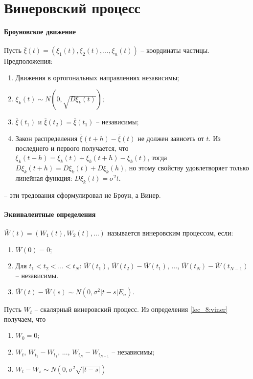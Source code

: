 \section{Винеровский процесс}

\paragraph{Броуновское движение}

Пусть $\bar{\xi}(t) = \left( \xi_1(t), \xi_2(t), \dots, \xi_n(t) \right) $
-- координаты частицы.
Предположения:
\begin{enumerate}
  \item Движения в ортогональных направлениях независимы;
  \item $\xi_k(t) \sim N(0, \sqrt{D\xi_k(t)})$;
  \item $\bar{\xi}(t_1)$ и $\bar{\xi}(t_2) = \bar{\xi}(t_1)$ -- независимы;
  \item Закон распределения $\bar{\xi}(t+h) - \bar{\xi}(t)$ не должен зависеть от $t$.
    Из последнего и первого получается, что $\xi_k (t+h) = \xi_k(t) + \xi_k(t+h) - \xi_k(t)$,
    тогда $D\xi_k(t+h) = D\xi_k(t) + D\xi_k(h)$, но этому свойству удовлетворяет только
    линейная функция: $D\xi_k(t) = \sigma^2 t$.
\end{enumerate}
-- эти тредования сформулировал не Броун, а Винер.

\paragraph{Эквивалентные определения}
\begin{definition}\label{lec_8:viner}
  $\bar{W}(t) = \left( W_1(t), W_2(t), \dots \right) $ называется винеровским процессом,
  если:
  \begin{enumerate}
    \item $\bar{W}(0) = 0$;
    \item Для $t_1 < t_2 < \dots < t_N$: $\bar{W}(t_1)$, $\bar{W}(t_2) - \bar{W}(t_1)$, $\dots$,
      $\bar{W}(t_N) - \bar{W}(t_{N-1})$ -- независимы.
    \item $\bar{W}(t) - \bar{W}(s) \sim N(0, \sigma^2 |t-s| E_n)$.
  \end{enumerate}
\end{definition}

Пусть $W_t$ -- скалярный винеровский процесс. Из определения \ref{lec_8:viner}
получаем, что
\begin{enumerate}
  \item $W_0 = 0$;
  \item $W_t$, $W_{t_2} - W_{t_1}$, $\dots$, $W_{t_N} - W_{t_{N-1}}$ -- независимы;
  \item $W_t - W_s \sim N(0, \sigma^2 \sqrt{|t-s|})$
\end{enumerate}


